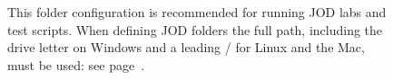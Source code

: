 \begin{figure}[htbp]
  \centering
  \hfill
\caption[JOD Folders]{This folder configuration is recommended for 
running JOD labs and test scripts. 
When defining JOD folders the full path, including the drive letter on Windows and a
leading / for Linux and the Mac, must be used: see page~\pageref{lst:foldercfg}.} 
  \label{eps:jodfolders}
\end{figure}
